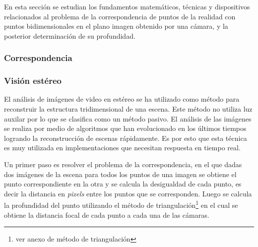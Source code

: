 En esta sección se estudian los fundamentos matemáticos, técnicas y dispositivos relacionados al problema de la correspondencia de puntos de la realidad con puntos bidimensionales en el plano imagen obtenido por una cámara, y la posterior determinación de su profundidad. 

\subsubsection{Correspondencia}

\subsubsection{Visión estéreo}

\cite {StereoReview} El análisis de imágenes de video en estéreo se ha utilizado como método para reconstruir la estructura tridimensional de una escena. Este método no utiliza luz auxilar por lo que se clasifica como un método pasivo. El análisis de las imágenes se realiza por medio de algoritmos que han evolucionado en los últimos tiempos logrando la reconstrucción de escenas rápidamente. Es por esto que esta técnica es muy utilizada en implementaciones que necesitan respuesta en tiempo real.

Un primer paso es resolver el problema de la correspondencia, en el que dadas dos imágenes de la escena para todos los puntos de una imagen se obtiene el punto correspondiente en la otra y se calcula la desigualdad de cada punto, es decir la distancia en \emph{pixels} entre los puntos que se corresponden. Luego se calcula la profundidad del punto utilizando el método de triangulación\footnote{ver anexo de método de triangulación} en el cual se obtiene la distancia focal de cada punto a cada una de las cámaras.


